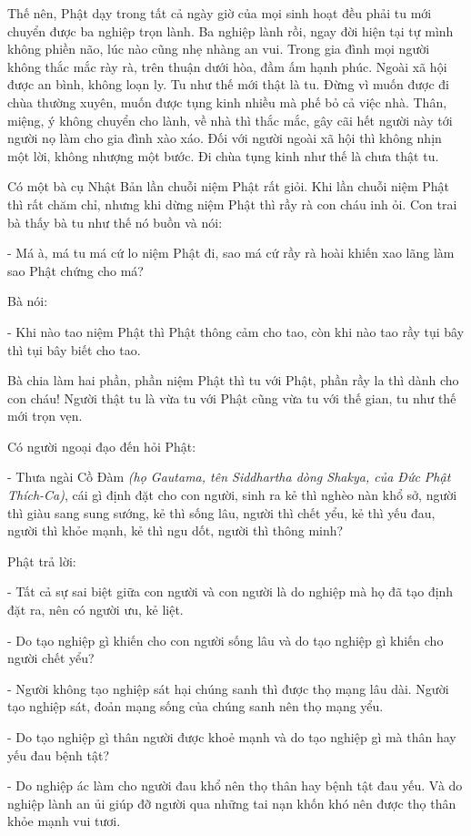 \documentclass[
  12pt,
  oneside]{book}
\begin{document}
Thế nên, Phật dạy trong tất cả ngày giờ của mọi sinh hoạt đều phải tu mới chuyển được ba nghiệp trọn lành. Ba nghiệp lành rồi, ngay đời hiện tại tự mình không phiền não, lúc nào cũng nhẹ nhàng an vui. Trong gia đình mọi người không thắc mắc rày rà, trên thuận dưới hòa, đầm ấm hạnh phúc. Ngoài xã hội được an bình, không loạn ly. Tu như thế mới thật là tu. Đừng vì muốn được đi chùa thường xuyên, muốn được tụng kinh nhiều mà phế bỏ cả việc nhà. Thân, miệng, ý không chuyển cho lành, về nhà thì thắc mắc, gây cãi hết người này tới người nọ làm cho gia đình xào xáo. Đối với người ngoài xã hội thì không nhịn một lời, không nhượng một bước. Đi chùa tụng kinh như thế là chưa thật tu.

Có một bà cụ Nhật Bản lần chuỗi niệm Phật rất giỏi. Khi lần chuỗi niệm Phật thì rất chăm chỉ, nhưng khi dừng niệm Phật thì rầy rà con cháu inh ỏi. Con trai bà thấy bà tu như thế nó buồn và nói:

- Má à, má tu má cứ lo niệm Phật đi, sao má cứ rầy rà hoài khiến xao lãng làm sao Phật chứng cho má?

Bà nói:

- Khi nào tao niệm Phật thì Phật thông cảm cho tao, còn khi nào tao rầy tụi bây thì tụi bây biết cho tao.

Bà chia làm hai phần, phần niệm Phật thì tu với Phật, phần rầy la thì dành cho con cháu! Người thật tu là vừa tu với Phật cũng vừa tu với thế gian, tu như thế mới trọn vẹn.

Có người ngoại đạo đến hỏi Phật:

- Thưa ngài Cồ Đàm \emph{(họ Gautama, tên Siddhartha dòng Shakya, của Đức Phật Thích-Ca)}, cái gì định đặt cho con người, sinh ra kẻ thì nghèo nàn khổ sở, người thì giàu sang sung sướng, kẻ thì sống lâu, người thì chết yểu, kẻ thì yếu đau, người thì khỏe mạnh, kẻ thì ngu dốt, người thì thông minh?

Phật trả lời:

- Tất cả sự sai biệt giữa con người và con người là do nghiệp mà họ đã tạo định đặt ra, nên có người ưu, kẻ liệt.

- Do tạo nghiệp gì khiến cho con người sống lâu và do tạo nghiệp gì khiến cho người chết yểu?

- Người không tạo nghiệp sát hại chúng sanh thì được thọ mạng lâu dài. Người tạo nghiệp sát, đoản mạng sống của chúng sanh nên thọ mạng yểu.

- Do tạo nghiệp gì thân người được khoẻ mạnh và do tạo nghiệp gì mà thân hay yếu đau bệnh tật?

- Do nghiệp ác làm cho người đau khổ nên thọ thân hay bệnh tật đau yếu. Và do nghiệp lành an ủi giúp đỡ người qua những tai nạn khốn khó nên được thọ thân khỏe mạnh vui tươi.
\end{document}
